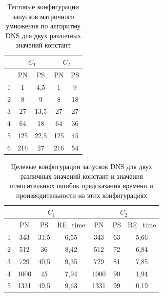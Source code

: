 			\begin{table}
				\centering
				\begin{tabular}{|r||c|c||c|c|}
					\hline
					            & \multicolumn{2}{c||}{\(C_1\)} & \multicolumn{2}{c|}{\(C_2\)}  \\ \hline
					\textnumero & PN  & PS                      & PN  & PS                      \\ \hline
					1           & 1   & 4,5                     & 1   & 9                       \\ \hline
					2           & 8   & 9                       & 8   & 18                      \\ \hline
					3           & 27  & 13,5                    & 27  & 27                      \\ \hline
					4           & 64  & 18                      & 64  & 36                      \\ \hline
					5           & 125 & 22,5                    & 125 & 45                      \\ \hline
					6           & 216 & 27                      & 216 & 54                      \\ \hline
				\end{tabular}
				\caption{Тестовые конфигурации запусков матричного умножения по алгоритму DNS для двух различных значений констант}
				\label{test_DNS}
			\end{table}

			\begin{table}
				\centering
				\begin{tabular}{|r||c|c|c||c|c|c|}
					\hline
					            & \multicolumn{3}{|c||}{\(C_1\)} & \multicolumn{3}{c|}{\(C_2\)} \\ \hline
					\textnumero & PN   & PS   & RE\_time        & PN   & PS & RE\_time          \\ \hline
					1           & 343  & 31,5 & 6,55            & 343  & 63 & 5,66              \\ \hline
					2           & 512  & 36   & 8,42            & 512  & 72 & 6,84              \\ \hline
					3           & 729  & 40,5 & 9,35            & 729  & 81 & 7,85              \\ \hline
					4           & 1000 & 45   & 7,94            & 1000 & 90 & 1,94              \\ \hline
					5           & 1331 & 49,5 & 9,63            & 1331 & 99 & 0,19              \\ \hline
				\end{tabular}
				\caption{Целевые конфигурации запусков DNS для двух различных значений констант и значения относительных ошибок предсказания времени и производительности на этих конфигурациях}
				\label{target_DNS}
			\end{table}

